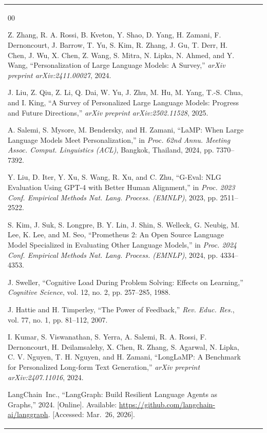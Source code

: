 \documentclass[conference]{IEEEtran}
\begin{document}
\begin{table}[htbp]
\begin{center}
\begin{tabular}{lll}


\begin{thebibliography}{00}

\bibitem{b1}
Z. Zhang, R. A. Rossi, B. Kveton, Y. Shao, D. Yang, H. Zamani, F. Dernoncourt, J. Barrow, T. Yu, S. Kim, R. Zhang, J. Gu, T. Derr, H. Chen, J. Wu, X. Chen, Z. Wang, S. Mitra, N. Lipka, N. Ahmed, and Y. Wang, ``Personalization of Large Language Models: A Survey,'' \textit{arXiv preprint arXiv:2411.00027}, 2024.

\bibitem{b2}
J. Liu, Z. Qiu, Z. Li, Q. Dai, W. Yu, J. Zhu, M. Hu, M. Yang, T.-S. Chua, and I. King, ``A Survey of Personalized Large Language Models: Progress and Future Directions,'' \textit{arXiv preprint arXiv:2502.11528}, 2025.

\bibitem{b3}
A. Salemi, S. Mysore, M. Bendersky, and H. Zamani, ``LaMP: When Large Language Models Meet Personalization,'' in \textit{Proc. 62nd Annu. Meeting Assoc. Comput. Linguistics (ACL)}, Bangkok, Thailand, 2024, pp. 7370--7392.

\bibitem{b4}
Y. Liu, D. Iter, Y. Xu, S. Wang, R. Xu, and C. Zhu, ``G-Eval: NLG Evaluation Using GPT-4 with Better Human Alignment,'' in \textit{Proc. 2023 Conf. Empirical Methods Nat. Lang. Process. (EMNLP)}, 2023, pp. 2511--2522.

\bibitem{b5}
S. Kim, J. Suk, S. Longpre, B. Y. Lin, J. Shin, S. Welleck, G. Neubig, M. Lee, K. Lee, and M. Seo, ``Prometheus 2: An Open Source Language Model Specialized in Evaluating Other Language Models,'' in \textit{Proc. 2024 Conf. Empirical Methods Nat. Lang. Process. (EMNLP)}, 2024, pp. 4334--4353.

\bibitem{b6}
J. Sweller, ``Cognitive Load During Problem Solving: Effects on Learning,'' \textit{Cognitive Science}, vol. 12, no. 2, pp. 257--285, 1988.

\bibitem{b7}
J. Hattie and H. Timperley, ``The Power of Feedback,'' \textit{Rev. Educ. Res.}, vol. 77, no. 1, pp. 81--112, 2007.

\bibitem{b8}
I. Kumar, S. Viswanathan, S. Yerra, A. Salemi, R. A. Rossi, F. Dernoncourt, H. Deilamsalehy, X. Chen, R. Zhang, S. Agarwal, N. Lipka, C. V. Nguyen, T. H. Nguyen, and H. Zamani, ``LongLaMP: A Benchmark for Personalized Long-form Text Generation,'' \textit{arXiv preprint arXiv:2407.11016}, 2024.

\bibitem{b9}
LangChain~Inc., ``LangGraph: Build Resilient Language Agents as Graphs,'' 2024. [Online]. Available: \url{https://github.com/langchain-ai/langgraph}. [Accessed: Mar.~26, 2026].


\end{thebibliography}
\end{tabular}
\end{center}
\end{table}
\end{document}
